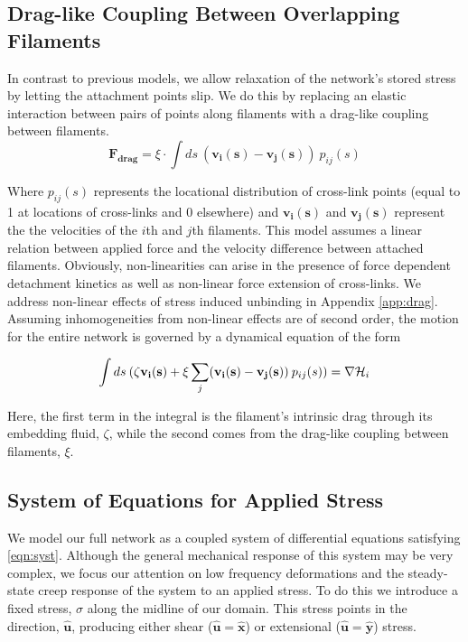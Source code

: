 \documentclass[pre,preprint]{revtex4-1}
\begin{document}
\subsection{Drag-like Coupling Between Overlapping Filaments}
\label{exp_drag}
In contrast to previous models, we allow relaxation of the network's stored stress by letting the attachment points slip.  We do this by replacing an elastic interaction between pairs of points along filaments with a drag-like coupling between filaments.
\begin{equation}
\mathbf{F_{drag}} = \xi \cdot \int ds \: (\mathbf{v_i(s)}-\mathbf{v_j(s)}) \: p_{ij}(s)
\end{equation}

Where $p_{ij}(s)$ represents the locational distribution of cross-link points (equal to 1 at locations of cross-links and 0 elsewhere) and $\mathbf{v_i(s)}$ and $\mathbf{v_j(s)}$ represent the the velocities of the $i$th and $j$th filaments.  This model assumes a linear relation between applied force and the velocity difference between attached filaments.  Obviously, non-linearities can arise in the presence of force dependent detachment kinetics as well as non-linear force extension of cross-links. We address non-linear effects of stress induced unbinding in Appendix \ref{app:drag}.  Assuming inhomogeneities from non-linear effects are of second order, the motion for the entire network is governed by a dynamical equation of the form

\begin{equation}
\label{eqn:syst}
\int ds \: (\mathbf{\zeta v_i(s)} + \xi \sum _j(\mathbf{v_i(s)}-\mathbf{v_j(s)}) \: p_{ij}(s))= \nabla {\cal H}_i
\end{equation}

Here, the first term in the integral is the filament's intrinsic drag through its embedding fluid, $\zeta$, while the second comes from the drag-like coupling between filaments, $\xi$.  


\subsection{System of Equations for Applied Stress}
We model our full network as a coupled system of differential equations satisfying \ref{eqn:syst}.  Although the general mechanical response of this system may be very complex, we focus our attention on low frequency deformations and the steady-state creep response of the system to an applied stress.  To do this we introduce a fixed stress, $\sigma$ along the midline of our domain.  This stress points in the direction, $\mathbf{\hat{u}}$, producing either shear ($\mathbf{\hat{u}}=\mathbf{\hat{x}}$) or extensional ($\mathbf{\hat{u}}=\mathbf{\hat{y}}$) stress.
\end{document}
